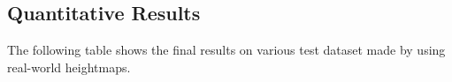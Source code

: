 \documentclass[../document.tex]{subfiles}
\begin{document}
\subsection{Quantitative Results}
The following table shows the final results on various test dataset made by using real-world heightmaps. 
\end{document}
